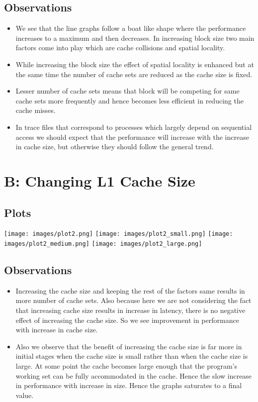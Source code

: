 \documentclass[11pt]{scrartcl}
\begin{document}
\subsection{Observations}
\begin{itemize}
    \item We see that the line graphs follow a boat like shape where the performance increases to a maximum and then decreases. In increasing block size two main factors come into play which are cache collisions and spatial locality. 
    \item While increasing the block size the effect of spatial locality is enhanced but at the same time the number of cache sets are reduced as the cache size is fixed.
    \item Lesser number of cache sets means that block will be competing for same cache sets more frequently and hence becomes less efficient in reducing the cache misses.
    \item In trace files that correspond to processes which largely depend on sequential access we should expect that the performance will increase with the increase in cache size, but otherwise they should follow the general trend.
    
\end{itemize}
\newpage
 \section{B: Changing L1 Cache Size}
\subsection{ Plots}
\texttt{[image: images/plot2.png]}
\texttt{[image: images/plot2\_small.png]}
\texttt{[image: images/plot2\_medium.png]}
\texttt{[image: images/plot2\_large.png]}

\subsection{Observations}
\begin{itemize}
    \item Increasing the cache size and keeping the rest of the factors same results in more number of cache sets. Also because here we are not considering the fact that increasing cache size results in increase in latency, there is no negative effect of increasing the cache size. So we see improvement in performance with increase in cache size.
    \item Also we observe that the benefit of increasing the cache size is far more in initial stages when the cache size is small rather than when the cache size is large. At some point the cache becomes large enough that the program's working set can be fully accommodated in the cache. Hence the slow increase in performance with increase in size. Hence the graphs saturates to a final value.
\end{itemize}
\end{document}

